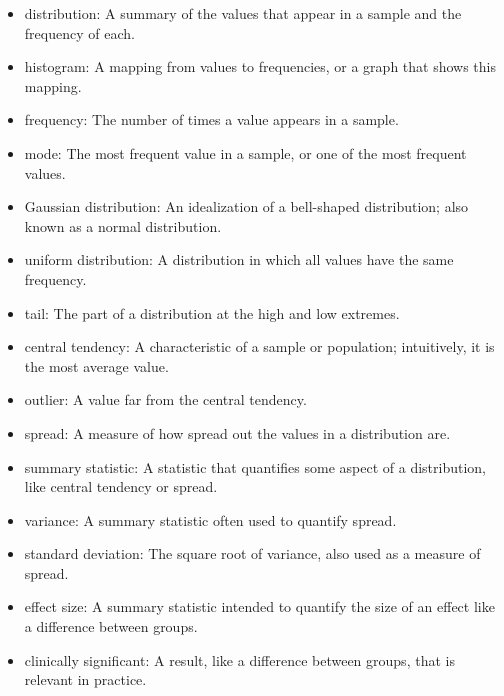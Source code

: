 \documentclass[12pt]{book}
\begin{document}
\begin{itemize}

\item distribution: A summary of the values that appear in a sample
and the frequency of each.

\item histogram: A mapping from values to frequencies, or a graph
that shows this mapping.

\item frequency: The number of times a value appears in a sample.

\item mode: The most frequent value in a sample, or one of the
most frequent values.

\item Gaussian distribution: An idealization of a bell-shaped distribution;
also known as a normal distribution. 

\item uniform distribution: A distribution in which all values have
the same frequency.

\item tail: The part of a distribution at the high and low extremes.

\item central tendency: A characteristic of a sample or population;
intuitively, it is the most average value. 

\item outlier: A value far from the central tendency.

\item spread: A measure of how spread out the values in a distribution
are.

\item summary statistic: A statistic that quantifies some aspect
of a distribution, like central tendency or spread.

\item variance: A summary statistic often used to quantify spread.

\item standard deviation: The square root of variance, also used
as a measure of spread.

\item effect size: A summary statistic intended to quantify the size
of an effect like a difference between groups.

\item clinically significant: A result, like a difference between groups,
that is relevant in practice.

\end{itemize}
\end{document}
